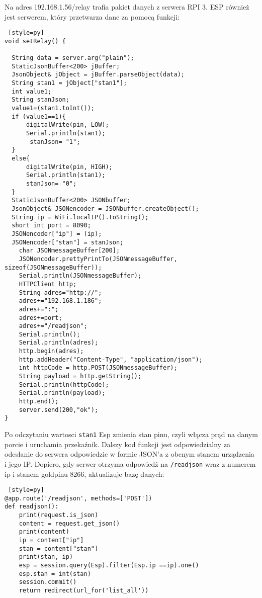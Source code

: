 \documentclass{xmgr}
\begin{document}
Na adres 192.168.1.56/relay trafia pakiet danych z serwera RPI 3. ESP również jest serwerem, który przetwarza dane za pomocą funkcji:
\begin{lstlisting} [style=py] 
void setRelay() {

  String data = server.arg("plain");
  StaticJsonBuffer<200> jBuffer;
  JsonObject& jObject = jBuffer.parseObject(data);
  String stan1 = jObject["stan1"];
  int value1;
  String stanJson;
  value1=(stan1.toInt());
  if (value1==1){
      digitalWrite(pin, LOW);
      Serial.println(stan1);
       stanJson= "1";
  }
  else{
      digitalWrite(pin, HIGH);
      Serial.println(stan1);
      stanJson= "0";
  }
  StaticJsonBuffer<200> JSONbuffer;  
  JsonObject& JSONencoder = JSONbuffer.createObject();
  String ip = WiFi.localIP().toString();
  short int port = 8090;
  JSONencoder["ip"] = (ip);
  JSONencoder["stan"] = stanJson;
    char JSONmessageBuffer[200];
    JSONencoder.prettyPrintTo(JSONmessageBuffer, sizeof(JSONmessageBuffer));
    Serial.println(JSONmessageBuffer);
    HTTPClient http;    
    String adres="http://";
    adres+="192.168.1.186";
    adres+=":";
    adres+=port;
    adres+="/readjson";
    Serial.println();
    Serial.println(adres);
    http.begin(adres);      
    http.addHeader("Content-Type", "application/json");  
    int httpCode = http.POST(JSONmessageBuffer);   
    String payload = http.getString();                                        
    Serial.println(httpCode);  
    Serial.println(payload);    
    http.end();
    server.send(200,"ok");
}
\end{lstlisting}
Po odczytaniu wartosci \texttt{stan1} Esp zmienia stan pinu, czyli włącza prąd na danym porcie i uruchamia przekaźnik. Dalszy kod funkcji jest odpowiedzialny za odesłanie do serwera odpowiedzie w formie JSON'a z obcnym stanem urządzenia i jego IP. Dopiero, gdy serwer otrzyma odpowiedź na \texttt{/readjson} wraz z numerem ip i stanem goldpinu 8266, aktualizuje bazę danych: 
\begin{lstlisting} [style=py] 
@app.route('/readjson', methods=['POST'])
def readjson():
    print(request.is_json)
    content = request.get_json()
    print(content)
    ip = content["ip"]
    stan = content["stan"]
    print(stan, ip)
    esp = session.query(Esp).filter(Esp.ip ==ip).one()
    esp.stan = int(stan)
    session.commit()
    return redirect(url_for('list_all'))
\end{lstlisting}

\end{document}
